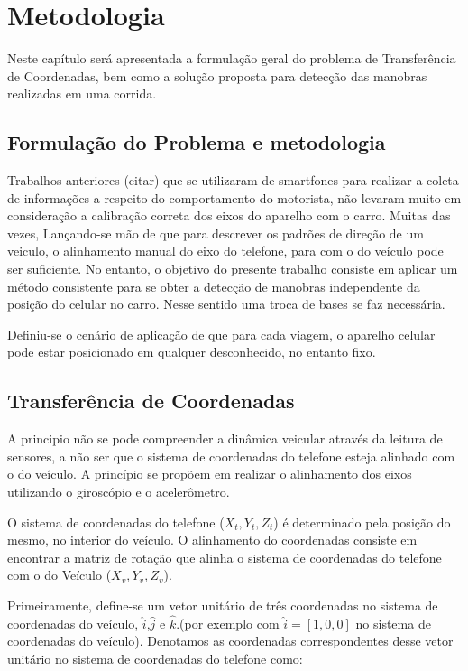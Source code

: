 \chapter{Metodologia} \label{Metodologia}

Neste capítulo será apresentada a formulação geral do problema de Transferência de Coordenadas, bem como a solução proposta para detecção das manobras realizadas em uma corrida.

\section{Formulação do Problema e metodologia}

Trabalhos anteriores (citar) que se utilizaram de smartfones para realizar a coleta de informações a respeito do comportamento do motorista, não levaram muito em consideração a calibração correta dos eixos do aparelho com o carro. Muitas das vezes, Lançando-se mão de que para descrever os padrões de direção de um veiculo, o alinhamento manual do eixo do telefone, para com o do veículo pode ser suficiente. No entanto, o objetivo do presente trabalho consiste em aplicar um método consistente para se obter a detecção de manobras independente da posição do celular no carro. Nesse sentido uma troca de bases se faz necessária.

Definiu-se o cenário de aplicação de que para cada viagem, o aparelho celular pode estar posicionado em qualquer desconhecido, no entanto fixo.

\section{Transferência de Coordenadas}

A principio não se pode compreender a dinâmica veicular através da leitura de sensores, a não ser que o sistema de coordenadas do telefone esteja alinhado com o do veículo. A princípio se propõem em realizar o alinhamento dos eixos utilizando o giroscópio e o acelerômetro.

O sistema de coordenadas do telefone ($X_t,Y_t,Z_t$) é determinado pela posição do mesmo, no interior do veículo. O alinhamento do coordenadas consiste em encontrar a matriz de rotação que alinha o sistema de coordenadas do telefone com o do Veículo ($X_v,Y_v,Z_v$). 

Primeiramente, define-se um vetor unitário de três coordenadas no sistema de coordenadas do veículo, $\hat{i}$,$\hat{j}$ e $\hat{k}$.(por exemplo com $\hat{i} = [1,0,0]$ no sistema de coordenadas do veículo). Denotamos as coordenadas correspondentes desse vetor unitário no sistema de coordenadas do telefone como:

